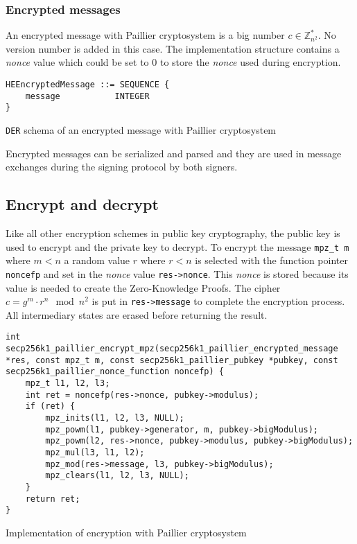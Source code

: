 \subsubsection{Encrypted messages}

An encrypted message with Paillier cryptosystem is a big number $c \in
\mathbb{Z}_{n^2}^*$. No version number is added in this case. The implementation
structure contains a \textit{nonce} value which could be set to 0 to store the \textit{nonce} used
during encryption.

\begin{listing}
  \begin{verbatim}
HEEncryptedMessage ::= SEQUENCE {
    message           INTEGER
}
  \end{verbatim}
	\caption{\texttt{DER} schema of an encrypted message with Paillier cryptosystem}
	\label{lst:DERSchemaPaillierEncMessage}
\end{listing}

Encrypted messages can be serialized and parsed and they are used in message
exchanges during the signing protocol by both signers.

\subsection{Encrypt and decrypt}

Like all other encryption schemes in public key cryptography, the public key is
used to encrypt and the private key to decrypt. To encrypt the message
\texttt{mpz\_t m} where $m < n$ a random value $r$ where $r < n$ is selected
with the function pointer \texttt{noncefp} and set in the \textit{nonce} value
\texttt{res->nonce}. This \textit{nonce} is stored because its value is needed to create the
Zero-Knowledge Proofs. The cipher $c = g^m \cdot r^n \mod n^2$ is put
in \texttt{res->message} to complete the encryption process. All intermediary
states are erased before returning the result.

\begin{listing}
  \begin{verbatim}
int secp256k1_paillier_encrypt_mpz(secp256k1_paillier_encrypted_message *res, const mpz_t m, const secp256k1_paillier_pubkey *pubkey, const secp256k1_paillier_nonce_function noncefp) {
    mpz_t l1, l2, l3;
    int ret = noncefp(res->nonce, pubkey->modulus);
    if (ret) {
        mpz_inits(l1, l2, l3, NULL);
        mpz_powm(l1, pubkey->generator, m, pubkey->bigModulus);
        mpz_powm(l2, res->nonce, pubkey->modulus, pubkey->bigModulus);
        mpz_mul(l3, l1, l2);
        mpz_mod(res->message, l3, pubkey->bigModulus);
        mpz_clears(l1, l2, l3, NULL);
    }
    return ret;
}
  \end{verbatim}
	\caption{Implementation of encryption with Paillier cryptosystem}
	\label{lst:implEncryptPaillier}
\end{listing}


